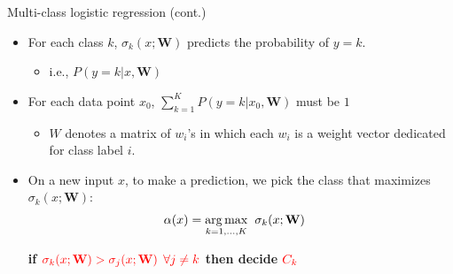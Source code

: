 \documentclass[serif, aspectratio=169]{beamer}
\begin{document}
    \begin{frame}{Multi-class logistic regression (cont.)}
        \begin{itemize}
            \item For each class $k$, $\sigma _k(x; \mathbf{W})$ predicts the probability of $y=k$.
            \begin{itemize}
                \item i.e., $P(y=k|x, \mathbf{W})$
            \end{itemize}
            \item For each data point $x_0$, $\sum _{k=1}^{K} P(y=k|x_0, \mathbf{W})$ must be $1$
            \begin{itemize}
                \item $W$ denotes a matrix of $w_i$'s in which each $w_i$ is a weight vector dedicated for class label $i$.
            \end{itemize}
            \item On a new input $x$, to make a prediction, we pick the class that maximizes $\sigma _k(x; \mathbf{W})$:
            \begin{align*}
                \alpha (x) &= \underset{k=1, \dots , K}{\arg\max} \hspace{0.2cm} \sigma _k(x; \mathbf{W})
            \end{align*}
            \begin{center}
                \textbf{if $\color{red} \sigma _k(x; \mathbf{W}) > \sigma _j(x; \mathbf{W})$ $\color{red} \forall j \neq k$ then decide $\color{red} C_k$}
            \end{center}
        \end{itemize}
    \end{frame}
\end{document}
